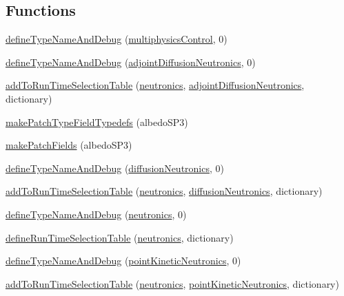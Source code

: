 \subsection*{Functions}
\begin{DoxyCompactItemize}
\item 
\hyperlink{namespaceFoam_a4f8db0d59e02bebe6498e0d168fbd891}{define\+Type\+Name\+And\+Debug} (\hyperlink{classFoam_1_1multiphysicsControl}{multiphysics\+Control}, 0)
\item 
\hyperlink{namespaceFoam_a25d39bdb67bee9ec0b4a1328227bf3e8}{define\+Type\+Name\+And\+Debug} (\hyperlink{classFoam_1_1adjointDiffusionNeutronics}{adjoint\+Diffusion\+Neutronics}, 0)
\item 
\hyperlink{namespaceFoam_ae331cdd35edb3af76b0da34e70c87242}{add\+To\+Run\+Time\+Selection\+Table} (\hyperlink{classFoam_1_1neutronics}{neutronics}, \hyperlink{classFoam_1_1adjointDiffusionNeutronics}{adjoint\+Diffusion\+Neutronics}, dictionary)
\item 
\hyperlink{namespaceFoam_a160dec4c58ee86bed756b16d47d7d021}{make\+Patch\+Type\+Field\+Typedefs} (albedo\+S\+P3)
\item 
\hyperlink{namespaceFoam_a5a41bd036bc74432f61fbe415d666879}{make\+Patch\+Fields} (albedo\+S\+P3)
\item 
\hyperlink{namespaceFoam_aeefea5bcca6e705c484342548e4de24c}{define\+Type\+Name\+And\+Debug} (\hyperlink{classFoam_1_1diffusionNeutronics}{diffusion\+Neutronics}, 0)
\item 
\hyperlink{namespaceFoam_a27a0ed89212123d1793fe7e592eb1460}{add\+To\+Run\+Time\+Selection\+Table} (\hyperlink{classFoam_1_1neutronics}{neutronics}, \hyperlink{classFoam_1_1diffusionNeutronics}{diffusion\+Neutronics}, dictionary)
\item 
\hyperlink{namespaceFoam_aa186014f9a072e56a0675c5bf4756389}{define\+Type\+Name\+And\+Debug} (\hyperlink{classFoam_1_1neutronics}{neutronics}, 0)
\item 
\hyperlink{namespaceFoam_aa6c5e0f36dbb719b090926fb292c1867}{define\+Run\+Time\+Selection\+Table} (\hyperlink{classFoam_1_1neutronics}{neutronics}, dictionary)
\item 
\hyperlink{namespaceFoam_a884021718558f21a78a9ac78d5218064}{define\+Type\+Name\+And\+Debug} (\hyperlink{classFoam_1_1pointKineticNeutronics}{point\+Kinetic\+Neutronics}, 0)
\item 
\hyperlink{namespaceFoam_ac359828b716af503c067985cb12130fe}{add\+To\+Run\+Time\+Selection\+Table} (\hyperlink{classFoam_1_1neutronics}{neutronics}, \hyperlink{classFoam_1_1pointKineticNeutronics}{point\+Kinetic\+Neutronics}, dictionary)

\end{DoxyCompactItemize}
